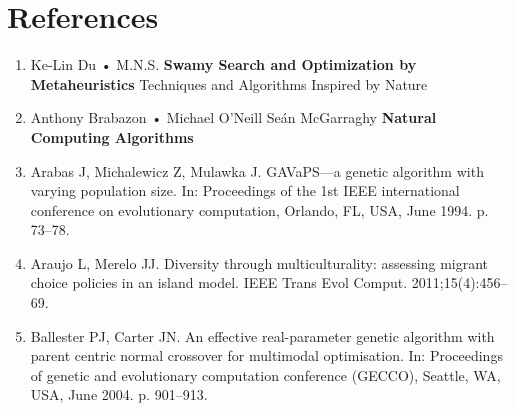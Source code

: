 \documentclass[14pt]{article}
\numberwithin{equation}{subsection}
\begin{document}
		
		\section{References}
		\begin{enumerate}
			\item Ke-Lin Du • M.N.S. \textbf{Swamy Search and Optimization by Metaheuristics} Techniques and Algorithms
			Inspired by Nature
			\item Anthony Brabazon • Michael O’Neill Seán McGarraghy \textbf{Natural Computing Algorithms}
			\item Arabas J, Michalewicz Z, Mulawka J. GAVaPS—a genetic algorithm with varying population size. In:
			Proceedings of the 1st IEEE international conference on evolutionary computation, Orlando, FL, USA, 
			June 1994. p. 73–78.
			\item Araujo L, Merelo JJ. Diversity through multiculturality: assessing migrant choice policies in
			an island model. IEEE Trans Evol Comput. 2011;15(4):456–69.
			\item Ballester PJ, Carter JN. An effective real-parameter genetic algorithm with parent centric normal
			crossover for multimodal optimisation. In: Proceedings of genetic and evolutionary computation conference 
			(GECCO), Seattle, WA, USA, June 2004. p. 901–913.
		\end{enumerate}
	
		
\end{document}
